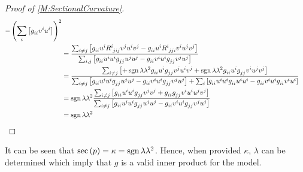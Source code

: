 \documentclass[../methodology.tex]{subfiles}
\begin{document}
\begin{proof}[Proof of \cref{M:SectionalCurvature}]
\begin{align*}
{      -\left(\sum_{i}\left[\tensor{g}{_i_i}\tensor{v}{^i}\tensor{u}{^i}\right]\right)^2
    }    \\
     & =
    \frac{
      \sum_{i\ne j}\left[
        \tensor{g}{_i_i}
        \tensor{u}{^i}
        \tensor{R}{^i_j_i_j}
        \tensor{v}{^j}
        \tensor{u}{^i}
        \tensor{v}{^j}
        -
        \tensor{g}{_i_i}
        \tensor{u}{^i}
        \tensor{R}{^i_j_j_i}
        \tensor{v}{^i}
        \tensor{u}{^j}
        \tensor{v}{^j}
        \right]
    }{
      \sum_{i,j}\left[
        \tensor{g}{_i_i}\tensor{u}{^i}\tensor{u}{^i}
        \tensor{g}{_j_j}\tensor{u}{^j}\tensor{u}{^j}
        -
        \tensor{g}{_i_i}\tensor{v}{^i}\tensor{u}{^i}
        \tensor{g}{_j_j}\tensor{v}{^j}\tensor{u}{^j}
        \right]
    }    \\
     & =
    \frac{
      \sum_{i\ne j}\left[
        +\sign{\lambda}\lambda^2
        \tensor{g}{_i_i}
        \tensor{u}{^i}
        \tensor{g}{_j_j}
        \tensor{v}{^j}
        \tensor{u}{^i}
        \tensor{v}{^j}
        +\sign{\lambda}\lambda^2
        \tensor{g}{_i_i}
        \tensor{u}{^i}
        \tensor{g}{_j_j}
        \tensor{v}{^i}
        \tensor{u}{^j}
        \tensor{v}{^j}
        \right]
    }{
      \sum_{i\ne j}\left[
        \tensor{g}{_i_i}\tensor{u}{^i}\tensor{u}{^i}
        \tensor{g}{_j_j}\tensor{u}{^j}\tensor{u}{^j}
        -
        \tensor{g}{_i_i}\tensor{v}{^i}\tensor{u}{^i}
        \tensor{g}{_j_j}\tensor{v}{^j}\tensor{u}{^j}
        \right]
      +
      \sum_{i}\left[
        \tensor{g}{_i_i}\tensor{u}{^i}\tensor{u}{^i}
        \tensor{g}{_i_i}\tensor{u}{^i}\tensor{u}{^i}
        -
        \tensor{g}{_i_i}\tensor{v}{^i}\tensor{u}{^i}
        \tensor{g}{_i_i}\tensor{v}{^i}\tensor{u}{^i}
        \right]
    }    \\
     & =
    \sign{\lambda}\lambda^2
    \frac{
      \sum_{i\ne j}\left[
        \tensor{g}{_i_i}
        \tensor{u}{^i}
        \tensor{u}{^i}
        \tensor{g}{_j_j}
        \tensor{v}{^j}
        \tensor{v}{^j}
        +
        \tensor{g}{_i_i}
        \tensor{g}{_j_j}
        \tensor{v}{^i}
        \tensor{u}{^i}
        \tensor{u}{^j}
        \tensor{v}{^j}
        \right]
    }{
      \sum_{i\ne j}\left[
        \tensor{g}{_i_i}\tensor{u}{^i}\tensor{u}{^i}
        \tensor{g}{_j_j}\tensor{u}{^j}\tensor{u}{^j}
        -
        \tensor{g}{_i_i}\tensor{v}{^i}\tensor{u}{^i}
        \tensor{g}{_j_j}\tensor{v}{^j}\tensor{u}{^j}
        \right]
    }    \\
     & =
    \sign{\lambda}\lambda^2 \qedhere
  \end{align*}
\end{proof}
\begin{remark}
  It can be seen that \(\operatorname{sec}\left(p\right)=\kappa=\operatorname{sgn}{\lambda}\lambda^2\).
  Hence, when provided \(\kappa\), \(\lambda\) can be determined
  which imply that \(g\) is a valid inner product for the model.
\end{remark}
\end{document}
